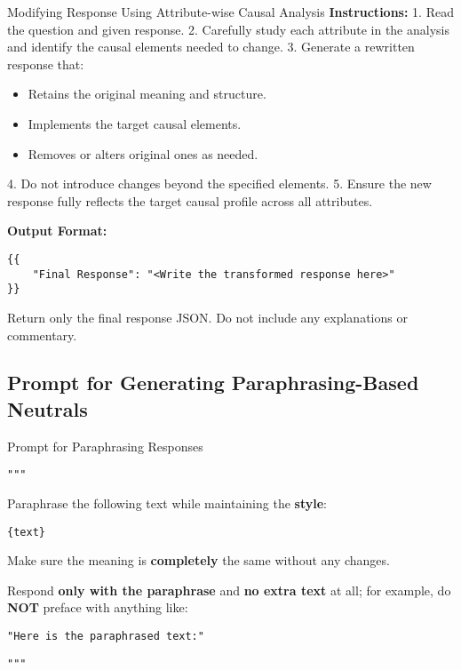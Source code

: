 \begin{promptbox}{Modifying Response Using Attribute-wise Causal Analysis}
\textbf{Instructions:}
1.  Read the question and given response.
2.  Carefully study each attribute in the analysis and identify the causal elements needed to change.
3.  Generate a rewritten response that:
    \begin{itemize}[leftmargin=2em] %
        \item Retains the original meaning and structure.
        \item Implements the target causal elements.
        \item Removes or alters original ones as needed.
    \end{itemize}
4.  Do not introduce changes beyond the specified elements.
5.  Ensure the new response fully reflects the target causal profile across all attributes.

\textbf{Output Format:}
\begin{verbatim}
{{
    "Final Response": "<Write the transformed response here>"
}}
\end{verbatim}

Return only the final response JSON. Do not include any explanations or commentary.

\end{promptbox}

\subsection{Prompt for Generating Paraphrasing-Based Neutrals}
\begin{promptbox}{Prompt for Paraphrasing Responses}

\texttt{"""}

Paraphrase the following text while maintaining the \textbf{style}:

\texttt{{\{text\}}}

Make sure the meaning is \textbf{completely} the same without any changes.

Respond \textbf{only with the paraphrase} and \textbf{no extra text} at all;  
for example, do \textbf{NOT} preface with anything like:

\texttt{"Here is the paraphrased text:"}

\texttt{"""}

\end{promptbox}
\clearpage


